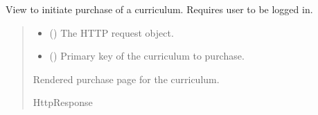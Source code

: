 \documentclass[letterpaper,10pt,english]{sphinxmanual}
\begin{document}
\begin{fulllineitems}
\label{\detokenize{courses:courses.views.purchase_curriculum}}
\pysigstartsignatures
\pysiglinewithargsret
{}
{\sphinxparamcomma {}}
{}
\pysigstopsignatures
\sphinxAtStartPar
View to initiate purchase of a curriculum. Requires user to be logged in.
\begin{quote}\begin{description}
\begin{itemize}
\item {} 
\sphinxAtStartPar
{} () \textendash{} The HTTP request object.

\item {} 
\sphinxAtStartPar
{} () \textendash{} Primary key of the curriculum to purchase.

\end{itemize}

\sphinxAtStartPar
Rendered purchase page for the curriculum.

\sphinxAtStartPar
HttpResponse

\end{description}\end{quote}

\end{fulllineitems}

\end{document}
